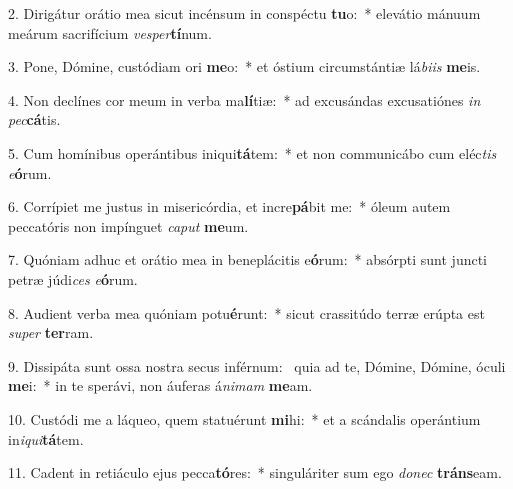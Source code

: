 2. Dirigátur orátio mea sicut incénsum in conspéctu \textbf{tu}o:~*  elevátio mánuum meárum sacrifícium \textit{ves}\textit{per}\textbf{tí}num.\

3. Pone, Dómine, custódiam ori \textbf{me}o:~*  et óstium circumstántiæ lá\textit{bi}\textit{is} \textbf{me}is.\

4. Non declínes cor meum in verba ma\textbf{lí}tiæ:~*  ad excusándas excusatiónes \textit{in} \textit{pec}\textbf{cá}tis.\

5. Cum homínibus operántibus iniqui\textbf{tá}tem:~*  et non communicábo cum eléc\textit{tis} \textit{e}\textbf{ó}rum.\

6. Corrípiet me justus in misericórdia, et incre\textbf{pá}bit me:~*  óleum autem peccatóris non impínguet \textit{ca}\textit{put} \textbf{me}um.\

7. Quóniam adhuc et orátio mea in beneplácitis e\textbf{ó}rum:~*  absórpti sunt juncti petræ júdi\textit{ces} \textit{e}\textbf{ó}rum.\

8. Audient verba mea quóniam potu\textbf{é}runt:~*  sicut crassitúdo terræ erúpta est \textit{su}\textit{per} \textbf{ter}ram.\

9. Dissipáta sunt ossa nostra secus inférnum: \dag\  quia ad te, Dómine, Dómine, óculi \textbf{me}i:~*  in te sperávi, non áuferas á\textit{ni}\textit{mam} \textbf{me}am.\

10. Custódi me a láqueo, quem statuérunt \textbf{mi}hi:~*  et a scándalis operántium in\textit{i}\textit{qui}\textbf{tá}tem.\

11. Cadent in retiáculo ejus pecca\textbf{tó}res:~*  singuláriter sum ego \textit{do}\textit{nec} \textbf{tráns}eam.\

